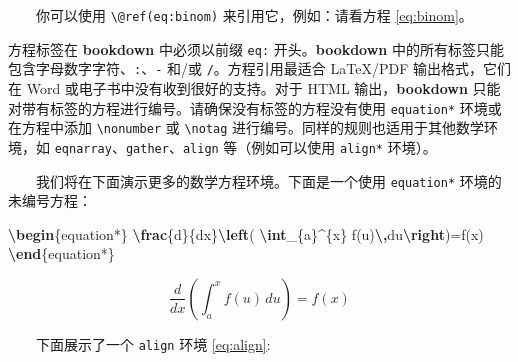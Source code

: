 \documentclass[
  12pt,
]{krantz}
\makeatletter
\newenvironment{Shaded}{\begin{snugshade}}{\end{snugshade}}
\newcommand{\ExtensionTok}[1]{#1}
\newcommand{\KeywordTok}[1]{\textcolor[rgb]{0.13,0.29,0.53}{\textbf{#1}}}
\newcommand{\NormalTok}[1]{#1}
\newcommand{\SpecialCharTok}[1]{\textcolor[rgb]{0.81,0.36,0.00}{\textbf{#1}}}
\newcommand{\SpecialStringTok}[1]{\textcolor[rgb]{0.31,0.60,0.02}{#1}}
\newenvironment{kframe}{%
\medskip{}
\setlength{\fboxsep}{.8em}
 \def\at@end@of@kframe{}%
 \ifinner\ifhmode%
  \def\at@end@of@kframe{\end{minipage}}%
  \begin{minipage}{\columnwidth}%
 \fi\fi%
 \def\FrameCommand##1{\hskip\@totalleftmargin \hskip-\fboxsep
 \colorbox{shadecolor}{##1}\hskip-\fboxsep
     \hskip-\linewidth \hskip-\@totalleftmargin \hskip\columnwidth}%
 \MakeFramed {\advance\hsize-\width
   \@totalleftmargin\z@ \linewidth\hsize
   \@setminipage}}%
 {\par\unskip\endMakeFramed%
 \at@end@of@kframe}
\newenvironment{rmdblock}[1]
  {
  \begin{itemize}
  \renewcommand{\labelitemi}{
    \raisebox{-.7\height}[0pt][0pt]{
      {\setkeys{Gin}{width=3em,keepaspectratio}\texttt{[image: images/\#1]}}
    }
  }
  \setlength{\fboxsep}{1em}
  \begin{kframe}
  \item
  }
  {
  \end{kframe}
  \end{itemize}
  }
\newenvironment{rmdcaution}
  {\begin{rmdblock}{caution}}
  {\end{rmdblock}}
\theoremstyle{definition}
\theoremstyle{definition}
\theoremstyle{definition}
\theoremstyle{definition}
\theoremstyle{remark}
\makeatother
\begin{document}
  你可以使用 \texttt{\textbackslash{}@ref(eq:binom)} 来引用它，例如：请看方程 \eqref{eq:binom}。

\begin{rmdcaution}
方程标签在 \textbf{bookdown} 中必须以前缀 \texttt{eq:} 开头。\textbf{bookdown} 中的所有标签只能包含字母数字字符、\texttt{:}、\texttt{-} 和/或 \texttt{/}。方程引用最适合 LaTeX/PDF 输出格式，它们在 Word 或电子书中没有收到很好的支持。对于 HTML 输出，\textbf{bookdown} 只能对带有标签的方程进行编号。请确保没有标签的方程没有使用 \texttt{equation*} 环境或在方程中添加 \texttt{\textbackslash{}nonumber} 或 \texttt{\textbackslash{}notag} 进行编号。同样的规则也适用于其他数学环境，如 \texttt{eqnarray}、\texttt{gather}、\texttt{align} 等（例如可以使用 \texttt{align*} 环境）。
\end{rmdcaution}

  我们将在下面演示更多的数学方程环境。下面是一个使用 \texttt{equation*} 环境的未编号方程：

\begin{Shaded}
\begin{Highlighting}[]
\KeywordTok{\textbackslash{}begin}\NormalTok{\{}\ExtensionTok{equation*}\NormalTok{\}}\SpecialStringTok{ }
\SpecialCharTok{\textbackslash{}frac}\SpecialStringTok{\{d\}\{dx\}}\SpecialCharTok{\textbackslash{}left}\SpecialStringTok{( }\SpecialCharTok{\textbackslash{}int}\SpecialStringTok{\_\{a\}\^{}\{x\} f(u)}\SpecialCharTok{\textbackslash{},}\SpecialStringTok{du}\SpecialCharTok{\textbackslash{}right}\SpecialStringTok{)=f(x)}
\KeywordTok{\textbackslash{}end}\NormalTok{\{}\ExtensionTok{equation*}\NormalTok{\} }
\end{Highlighting}
\end{Shaded}

\begin{equation*}
\frac{d}{dx}\left( \int_{a}^{x} f(u)\,du\right)=f(x)
\end{equation*}

  下面展示了一个 \texttt{align} 环境 \eqref{eq:align}:
\end{document}
